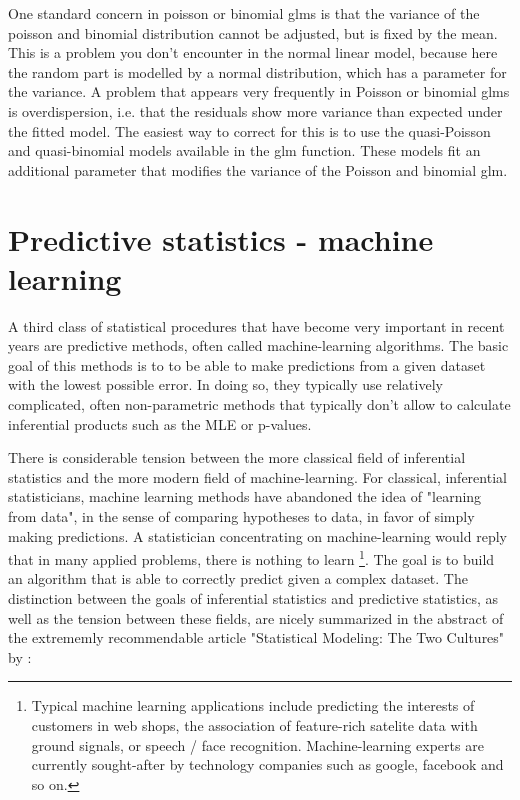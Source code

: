 \documentclass[a4paper,twoside]{tufte-book}\usepackage[]{graphicx}\usepackage[]{color}
\begin{document}
One standard concern in poisson or binomial glms is that the variance of the poisson and binomial distribution cannot be adjusted, but is fixed by the mean. This is a problem you don't encounter in the normal linear model, because here the random part is modelled by a normal distribution, which has a parameter for the variance. A problem that appears very frequently in Poisson or binomial glms is overdispersion, i.e. that the residuals show more variance than expected under the fitted model.  The easiest way to correct for this is to use the quasi-Poisson and quasi-binomial models available in the glm function. These models fit an additional parameter that modifies the variance of the Poisson and binomial glm. 


\chapter{Predictive statistics - machine learning}

A third class of statistical procedures that have become very important in recent years are predictive methods, often called machine-learning algorithms. The basic goal of this methods is to to be able to make predictions from a given dataset with the lowest possible error. In doing so, they typically use relatively complicated, often non-parametric methods that typically don't allow to calculate inferential products such as the MLE or p-values.

There is considerable tension between the more classical field of inferential statistics and the more modern field of machine-learning. For classical, inferential statisticians, machine learning methods have abandoned the idea of "learning from data", in the sense of comparing hypotheses to data, in favor of simply making predictions. A statistician concentrating on machine-learning would reply that in many applied problems, there is nothing to learn \footnote{Typical machine learning applications include predicting the interests of customers in web shops, the association of feature-rich satelite data with ground signals, or speech / face recognition. Machine-learning experts are currently sought-after by technology companies such as google, facebook and so on.}. The goal is to build an algorithm that is able to correctly predict given a complex dataset. The distinction between the goals of inferential statistics and predictive statistics, as well as the tension between these fields, are nicely summarized in the abstract of the extrememly recommendable article "Statistical Modeling: The Two Cultures" by \citet{Breiman-StatisticalModelingTwo-2001}:
\end{document}
